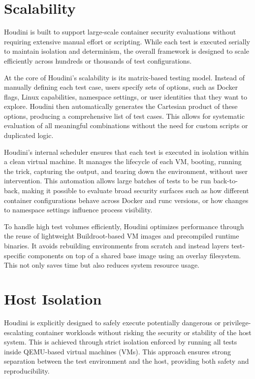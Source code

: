 \documentclass[12pt]{report}
\begin{document}
\begin{doublespace}
\section{Scalability}

Houdini is built to support large-scale container security evaluations without requiring extensive manual effort or scripting. While each test is executed serially to maintain isolation and determinism, the overall framework is designed to scale efficiently across hundreds or thousands of test configurations.

At the core of Houdini’s scalability is its matrix-based testing model. Instead of manually defining each test case, users specify sets of options, such as Docker flags, Linux capabilities, namespace settings, or user identities that they want to explore. Houdini then automatically generates the Cartesian product of these options, producing a comprehensive list of test cases. This allows for systematic evaluation of all meaningful combinations without the need for custom scripts or duplicated logic.

Houdini’s internal scheduler ensures that each test is executed in isolation within a clean virtual machine. It manages the lifecycle of each VM, booting, running the trick, capturing the output, and tearing down the environment, without user intervention. This automation allows large batches of tests to be run back-to-back, making it possible to evaluate broad security surfaces such as how different container configurations behave across Docker and runc versions, or how changes to namespace settings influence process visibility.

To handle high test volumes efficiently, Houdini optimizes performance through the reuse of lightweight Buildroot-based VM images and precompiled runtime binaries. It avoids rebuilding environments from scratch and instead layers test-specific components on top of a shared base image using an overlay filesystem. This not only saves time but also reduces system resource usage.


\section{Host Isolation}

Houdini is explicitly designed to safely execute potentially dangerous or privilege-escalating container workloads without risking the security or stability of the host system. This is achieved through strict isolation enforced by running all tests inside QEMU-based virtual machines (VMs). This approach ensures strong separation between the test environment and the host, providing both safety and reproducibility.


\end{doublespace}
\end{document}
